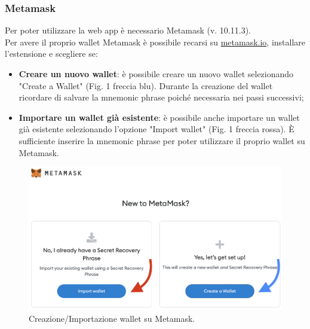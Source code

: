 \documentclass[a4paper, 12pt]{article}
\begin{document}
\subsubsection{Metamask}
Per poter utilizzare la web app è necessario Metamask (v. 10.11.3).\\
Per avere il proprio wallet Metamask è possibile recarsi su \href{https://www.metamask.io}{metamask.io}, installare l'estensione e scegliere se:
\begin{itemize}
  \item \textbf{Creare un nuovo wallet}: è possibile creare un nuovo wallet selezionando "Create a Wallet" (Fig. 1 freccia blu). Durante la creazione del wallet ricordare di salvare la mnemonic phrase poiché necessaria nei passi successivi;
  \item \textbf{Importare un wallet già esistente}: è possibile anche importare un wallet già esistente selezionando l'opzione "Import wallet" (Fig. 1 freccia rossa). È sufficiente inserire la mnemonic phrase per poter utilizzare il proprio wallet su Metamask.
\end{itemize}
\FloatBarrier
\begin{figure}[!h]
\centering
\includegraphics[width=0.8\linewidth]{img/metamask.png}
\caption{Creazione/Importazione wallet su Metamask.}
\end{figure}
\FloatBarrier
\end{document}
